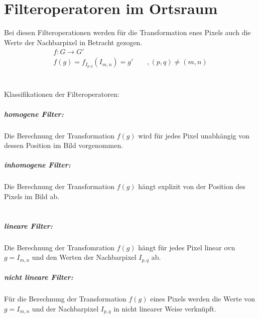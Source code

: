 



\chapter{Filteroperatoren im Ortsraum}
Bei diesen Filteroperationen werden für die Transformation enes Pixels auch die Werte der Nachbarpixel in Betracht gezogen.
\[\begin{aligned}
	f:G \rightarrow G'\\
	f(g) = f_{I_{p,q}} (I_{m,n}) = g' \qquad , (p,q) \neq (m,n)
\end{aligned}\]
~\\\\
Klassifikationen der Filteroperatoren:\\
\paragraph{homogene Filter:\\}
Die Berechnung der Transformation $f(g)$ wird für jedes Pixel unabhängig von dessen Position im Bild vorgenommen.\\
\paragraph{inhomogene Filter:\\}
Die Berechnung der Transformation $f(g)$ hängt explizit von der Position des Pixels im Bild ab.\\
\\
\paragraph{lineare Filter:\\}
Die Berechnung der Transfomration $f(g)$ hängt für jedes Pixel linear ovn $g=I_{m,n}$ und den Werten der Nachbarpixel $I_{p,q}$ ab.\\
\paragraph{nicht lineare Filter:\\}
Für die Berechnung der Transformation $f(g)$ eines Pixels werden die Werte von $g=I_{m,n}$ und der Nachbarpixel $I_{p,q}$ in nicht linearer Weise verknüpft.


